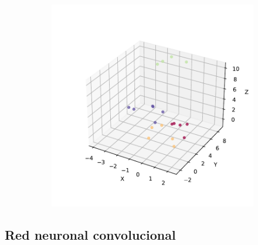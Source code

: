 \begin{figure}[h]
\begin{subfigure}{0.45\textwidth}
    \caption{}
    \label{fig:}
  \end{subfigure}
  \begin{subfigure}{0.45\textwidth}
    \centering
    \includegraphics[width=\textwidth]{figures/test-asig-artificial.pdf}
    \caption{}
    \label{fig:}
  \end{subfigure}
  \caption[Prueba de red neuronal secuencial.]{}
  \label{fig:}
\end{figure}

\subsection{Red neuronal convolucional}